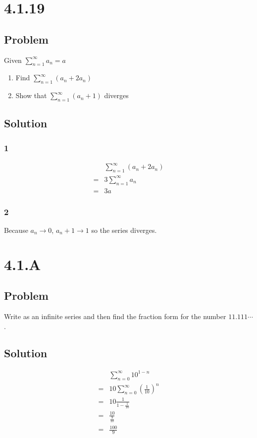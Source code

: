 \documentclass[12pt]{article}
\newcommand{\round}[1]{\left(       #1 \right)      }
\begin{document}
\section*{4.1.19}

\subsection*{Problem}
Given $\sum_{n = 1}^\infty a_n = a$
\begin{enumerate}
    \item Find $\sum_{n = 1}^\infty (a_n + 2a_n)$
    \item Show that $\sum_{n = 1}^\infty (a_n + 1)$ diverges
\end{enumerate}

\subsection*{Solution}

\subsubsection*{1}
\begin{align*}
     & \sum_{n=1}^\infty (a_n + 2a_n) \\
    =& 3 \sum_{n=1}^\infty a_n \\
    =& 3a
\end{align*}

\subsubsection*{2}
Because $a_n \to 0$, $a_n + 1 \to 1$ so the series diverges.



\section*{4.1.A}

\subsection*{Problem}
Write as an infinite series and then find the fraction form for the number $11.111\cdots$.

\subsection*{Solution}
\begin{align*}
     & \sum_{n=0}^\infty 10^{1-n} \\
    =& 10 \sum_{n=0}^\infty \round{\frac{1}{10}}^n \\
    =& 10 \frac{1}{1 - \frac{1}{10}} \\
    =& \frac{10}{\frac{9}{10}} \\
    =& \frac{100}{9}
\end{align*}
\end{document}
